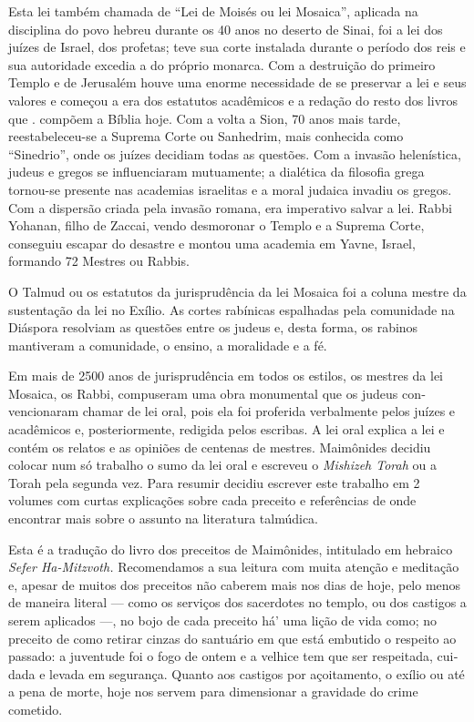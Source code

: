 Esta lei também chamada de ``Lei de Moisés ou lei Mosaica'', aplicada na
disciplina do povo hebreu durante os 40 anos no deserto de Sinai, foi a
lei dos juízes de Israel, dos profetas; teve sua corte instalada durante
o período dos reis
e sua autoridade excedia a do próprio
monarca. Com a destruição do primeiro
Tem­plo e de Jerusalém houve uma enorme necessidade de se preservar a
lei e seus valo­res e começou a era dos estatutos acadêmicos e a redação
do resto dos livros que . compõem a Bíblia hoje.
Com a volta a Sion, 70 anos mais tarde, reestabeleceu-se a Suprema
Corte ou Sanhedrim, mais conhecida como ``Sinedrio'', onde os juízes
decidiam todas as questões. Com a invasão
helenística, judeus e gregos se influen­ciaram mutuamente; a dialética
da filosofia grega tornou-se presente nas academias israelitas e a moral
judaica invadiu os gregos. Com a dispersão
criada pela invasão romana, era imperativo salvar a lei. Rabbi Yohanan,
filho de Zaccai, vendo desmo­ronar o Templo e a Suprema Corte, conseguiu
escapar do desastre e montou uma academia em Yavne, Israel, formando 72
Mestres ou Rabbis.

O Talmud ou os estatutos da jurisprudência da lei Mosaica foi a coluna
mestre da sustentação da lei no Exílio. As cortes rabínicas espalhadas
pela comuni­dade na Diáspora resolviam as questões entre os judeus e,
desta forma, os rabinos mantiveram a comunidade, o ensino, a moralidade
e a fé.

Em mais de 2500 anos de jurisprudência em todos os estilos, os mestres
da lei Mosaica, os Rabbi, compuseram uma obra monumental que os judeus
con­vencionaram chamar de lei oral, pois ela foi proferida verbalmente
pelos juízes e acadêmicos e, posteriormente, redigida pelos escribas. A
lei oral explica a lei e con­tém os relatos e as opiniões de centenas de
mestres. Maimônides decidiu colocar num só trabalho o sumo da lei oral e
escreveu o \emph{Mishizeh Torah} ou a Torah pela segunda vez. Para
resumir decidiu escrever este trabalho em 2 volumes com curtas
explicações sobre cada preceito e referências de onde encontrar mais
sobre o as­sunto na literatura talmúdica.

Esta é a tradução do livro dos preceitos de Maimônides, intitulado em
hebraico \emph{Sefer Ha-Mitzvoth.} Recomendamos a sua leitura com muita
atenção e me­ditação e, apesar de muitos dos preceitos não caberem mais
nos dias de hoje, pelo menos de maneira literal --- como os serviços dos
sacerdotes no templo, ou dos cas­tigos a serem aplicados ---, no bojo de
cada preceito há' uma lição de vida como; no preceito de como retirar
cinzas do santuário em que está embutido o respeito ao passado: a
juventude foi o fogo de ontem e a velhice tem que ser respeitada,
cui­dada e levada em segurança. Quanto aos castigos por açoitamento, o
exílio ou até a pena de morte, hoje nos servem para dimensionar a
gravidade do crime cometido.

